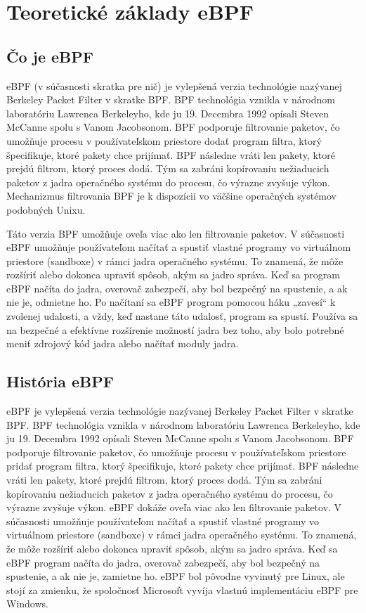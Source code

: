 \section{Teoretické základy eBPF}
\subsection{Čo je eBPF}
eBPF (v súčasnosti skratka pre nič) je vylepšená verzia technológie nazývanej Berkeley Packet Filter v skratke BPF. BPF technológia vznikla v národnom laboratóriu Lawrenca Berkeleyho, kde ju 19. Decembra 1992 opísali Steven McCanne spolu s Vanom Jacobsonom. BPF podporuje filtrovanie paketov, čo umožňuje procesu v používateľskom priestore dodať program filtra, ktorý špecifikuje, ktoré pakety chce prijímať. BPF následne vráti len pakety, ktoré prejdú filtrom, ktorý proces dodá. Tým sa zabráni kopírovaniu nežiaducich paketov z jadra operačného systému do procesu, čo výrazne zvyšuje výkon. Mechanizmus filtrovania BPF je k dispozícii vo väčšine operačných systémov podobných Unixu. 

Táto verzia BPF umožňuje oveľa viac ako len filtrovanie paketov. V súčasnosti eBPF umožňuje používateľom načítať a spustiť vlastné programy vo virtuálnom priestore (sandboxe) v rámci jadra operačného systému. To znamená, že môže rozšíriť alebo dokonca upraviť spôsob, akým sa jadro správa. Keď sa program eBPF načíta do jadra, overovač zabezpečí, aby bol bezpečný na spustenie, a ak nie je, odmietne ho. Po načítaní sa eBPF program pomocou háku „zavesí“ k zvolenej udalosti, a vždy, keď nastane táto udalosť, program sa spustí. Používa sa na bezpečné a efektívne rozšírenie možností jadra bez toho, aby bolo potrebné meniť zdrojový kód jadra alebo načítať moduly jadra.
 ~\cite{eBPF}
\subsection{História eBPF}
eBPF je vylepšená verzia technológie nazývanej Berkeley Packet Filter v skratke BPF. BPF technológia vznikla v národnom laboratóriu Lawrenca Berkeleyho, kde ju 19. Decembra 1992 opísali Steven McCanne spolu s Vanom Jacobsonom. BPF podporuje filtrovanie paketov, čo umožňuje procesu v používateľskom priestore pridať program filtra, ktorý špecifikuje, ktoré pakety chce prijímať. BPF následne vráti len pakety, ktoré prejdú filtrom, ktorý proces dodá. Tým sa zabráni kopírovaniu nežiaducich paketov z jadra operačného systému do procesu, čo výrazne zvyšuje výkon.
eBPF dokáže oveľa viac ako len filtrovanie paketov. V súčasnosti umožňuje používateľom načítať a spustiť vlastné programy vo virtuálnom priestore (sandboxe) v rámci jadra operačného systému. To znamená, že môže rozšíriť alebo dokonca upraviť spôsob, akým sa jadro správa. Keď sa eBPF program načíta do jadra, overovač zabezpečí, aby bol bezpečný na spustenie, a ak nie je, zamietne ho. eBPF bol pôvodne vyvinutý pre Linux, ale stojí za zmienku, že spoločnosť Microsoft vyvíja vlastnú implementáciu eBPF pre Windows.


